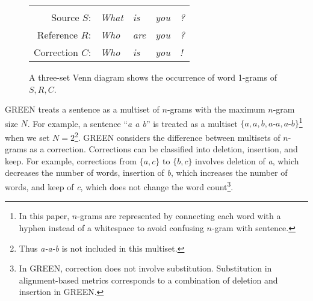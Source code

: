 \documentclass[11pt]{article}
\begin{document}
\begin{figure}[!t]
    \begin{tabular}{rllll}
        \vspace*{0.0em} \\
        Source $S$: & \textit{What} & \textit{is} & \textit{you} & \textit{?} \\
        Reference $R$: & \textit{Who} & \textit{are} & \textit{you} & \textit{?} \\
        Correction $C$: & \textit{Who} & \textit{is} & \textit{you} & \textit{!}
    \end{tabular}
    \caption{A three-set Venn diagram shows the occurrence of word 1-grams of $S, R, C$.}
    \label{fig:Who_are_you_?}
\end{figure}

GREEN treats a sentence as a multiset of $n$-grams with the maximum $n$-gram size $N$.
For example, a sentence ``\textit{a a b}'' is treated as a multiset $\{\textit{a}, \textit{a}, \textit{b}, \textit{a-a}, \textit{a-b}\}$\footnote{In this paper, $n$-grams are represented by connecting each word with a hyphen instead of a whitespace to avoid confusing $n$-gram with sentence.} when we set $N = 2$\footnote{Thus \textit{a-a-b} is not included in this multiset.}.
GREEN considers the difference between multisets of $n$-grams as a correction.
Corrections can be classified into deletion, insertion, and keep.
For example, corrections from $\{\textit{a}, \textit{c}\}$ to $\{\textit{b}, \textit{c}\}$ involves deletion of \textit{a}, which decreases the number of words, insertion of \textit{b}, which increases the number of words, and keep of \textit{c}, which does not change the word count\footnote{In GREEN, correction does not involve substitution. Substitution in alignment-based metrics corresponds to a combination of deletion and insertion in GREEN.}.
\end{document}
